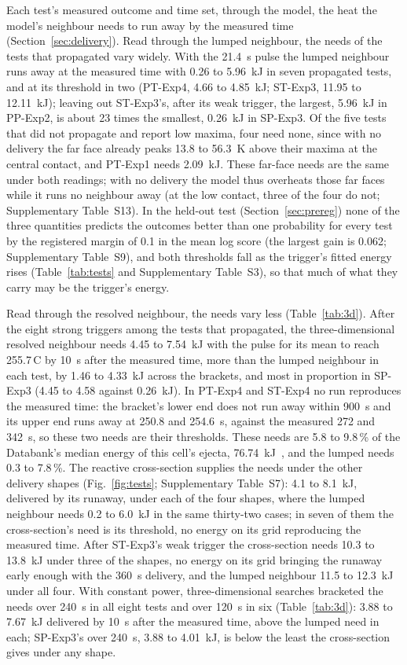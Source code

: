 \documentclass[preprint,12pt]{elsarticle}
\newcommand{\degC}{\,\textdegree C}
\begin{document}
Each test's measured outcome and time set, through the model, the heat the model's neighbour needs to run away by the measured time (Section~\ref{sec:delivery}). Read through the lumped neighbour, the needs of the tests that propagated vary widely. With the 21.4~s pulse the lumped neighbour runs away at the measured time with 0.26 to 5.96~kJ in seven propagated tests, and at its threshold in two (PT-Exp4, 4.66 to 4.85~kJ; ST-Exp3, 11.95 to 12.11~kJ); leaving out ST-Exp3's, after its weak trigger, the largest, 5.96~kJ in PP-Exp2, is about 23 times the smallest, 0.26~kJ in SP-Exp3. Of the five tests that did not propagate and report low maxima, four need none, since with no delivery the far face already peaks 13.8 to 56.3~K above their maxima at the central contact, and PT-Exp1 needs 2.09~kJ. These far-face needs are the same under both readings; with no delivery the model thus overheats those far faces while it runs no neighbour away (at the low contact, three of the four do not; Supplementary Table~S13). In the held-out test (Section~\ref{sec:prereg}) none of the three quantities predicts the outcomes better than one probability for every test by the registered margin of 0.1 in the mean log score (the largest gain is 0.062; Supplementary Table~S9), and both thresholds fall as the trigger's fitted energy rises (Table~\ref{tab:tests} and Supplementary Table~S3), so that much of what they carry may be the trigger's energy.

Read through the resolved neighbour, the needs vary less (Table~\ref{tab:3d}). After the eight strong triggers among the tests that propagated, the three-dimensional resolved neighbour needs 4.45 to 7.54~kJ with the pulse for its mean to reach 255.7\degC{} by 10~s after the measured time, more than the lumped neighbour in each test, by 1.46 to 4.33~kJ across the brackets, and most in proportion in SP-Exp3 (4.45 to 4.58 against 0.26~kJ). In PT-Exp4 and ST-Exp4 no run reproduces the measured time: the bracket's lower end does not run away within 900~s and its upper end runs away at 250.8 and 254.6~s, against the measured 272 and 342~s, so these two needs are their thresholds. These needs are 5.8 to 9.8\,\% of the Databank's median energy of this cell's ejecta, 76.74~kJ~\cite{finegan2024databank}, and the lumped needs 0.3 to 7.8\,\%. The reactive cross-section supplies the needs under the other delivery shapes (Fig.~\ref{fig:tests}; Supplementary Table~S7): 4.1 to 8.1~kJ, delivered by its runaway, under each of the four shapes, where the lumped neighbour needs 0.2 to 6.0~kJ in the same thirty-two cases; in seven of them the cross-section's need is its threshold, no energy on its grid reproducing the measured time. After ST-Exp3's weak trigger the cross-section needs 10.3 to 13.8~kJ under three of the shapes, no energy on its grid bringing the runaway early enough with the 360~s delivery, and the lumped neighbour 11.5 to 12.3~kJ under all four. With constant power, three-dimensional searches bracketed the needs over 240~s in all eight tests and over 120~s in six (Table~\ref{tab:3d}): 3.88 to 7.67~kJ delivered by 10~s after the measured time, above the lumped need in each; SP-Exp3's over 240~s, 3.88 to 4.01~kJ, is below the least the cross-section gives under any shape.
\end{document}
